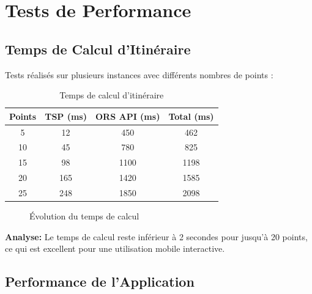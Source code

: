 \documentclass[12pt,a4paper]{report}
\begin{document}
\section{Tests de Performance}

\subsection{Temps de Calcul d'Itinéraire}

Tests réalisés sur plusieurs instances avec différents nombres de points :

\begin{table}[H]
\centering
\begin{tabular}{|c|c|c|c|}
\hline
\textbf{Points} & \textbf{TSP (ms)} & \textbf{ORS API (ms)} & \textbf{Total (ms)} \\
\hline
5 & 12 & 450 & 462 \\
10 & 45 & 780 & 825 \\
15 & 98 & 1100 & 1198 \\
20 & 165 & 1420 & 1585 \\
25 & 248 & 1850 & 2098 \\
\hline
\end{tabular}
\caption{Temps de calcul d'itinéraire}
\end{table}

\begin{figure}[H]
\centering
{}
\caption{Évolution du temps de calcul}
\end{figure}

\textbf{Analyse:} Le temps de calcul reste inférieur à 2 secondes pour jusqu'à 20 points, ce qui est excellent pour une utilisation mobile interactive.

\subsection{Performance de l'Application}
\end{document}
